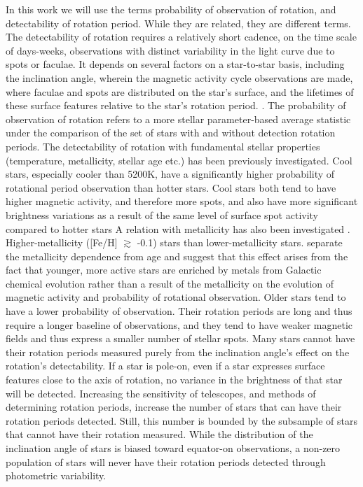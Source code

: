 In this work we will use the terms probability of observation of rotation, and detectability of rotation period.
While they are related, they are different terms.
The detectability of rotation requires a relatively short cadence, on the time scale of days-weeks, observations with distinct variability in the light curve due to spots or faculae.
It depends on several factors on a star-to-star basis, including the inclination angle, wherein the magnetic activity cycle observations are made, where faculae and spots are distributed on the star's surface, and the lifetimes of these surface features relative to the star's rotation period. \citep{aigrain_hare_2015, reinhold_transition_2019, reinhold_where_2021}.
The probability of observation of rotation refers to a more stellar parameter-based average statistic under the comparison of the set of stars with and without detection rotation periods.
The detectability of rotation with fundamental stellar properties (temperature, metallicity, stellar age etc.) has been previously investigated.
Cool stars, especially cooler than 5200K, have a significantly higher probability of rotational period observation than hotter stars.
Cool stars both tend to have higher magnetic activity, and therefore more spots, and also have more significant brightness variations as a result of the same level of surface spot activity compared to hotter stars \citep{ mcquillan_rotation_2014, santos_surface_2021, zhang_magnetic_2020}
A relation with metallicity has also been investigated \citep{amard_evidence_2020,see_photometric_2021,claytor_tess_2023}.
Higher-metallicity ([Fe/H] $\gtrsim$ -0.1) stars  than lower-metallicity stars.
 \citet{avallone_rotation_2022, masuda_detectability_2022} separate the metallicity dependence from age and suggest that this effect arises from the fact that younger, more active stars are enriched by metals from Galactic chemical evolution rather than a result of the metallicity on the evolution of magnetic activity and probability of rotational observation.
Older stars tend to have a lower probability of observation. 
Their rotation periods are long and thus require a longer baseline of observations, and they tend to have weaker magnetic fields and thus express a smaller number of stellar spots.
Many stars cannot have their rotation periods measured purely from the inclination angle's effect on the rotation's detectability.
If a star is pole-on, even if a star expresses surface features close to the axis of rotation, no variance in the brightness of that star will be detected.
Increasing the sensitivity of telescopes, and methods of determining rotation periods, increase the number of stars that can have their rotation periods detected.
Still, this number is bounded by the subsample of stars that cannot have their rotation measured.
While the distribution of the inclination angle of stars is biased toward equator-on observations, a non-zero population of stars will never have their rotation periods detected through photometric variability.

